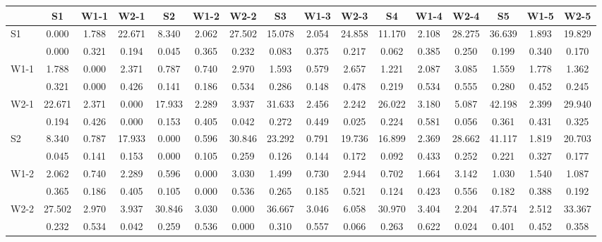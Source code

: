 \begin{table*}[h!]
\begin{center}
\begin{tabular}{| l | c | c | c | c | c | c | c | c | c | c | c | c | c | c | c |}\hline
 & S1 & W1-1 & W2-1 & S2 & W1-2 & W2-2 & S3 & W1-3 & W2-3 & S4 & W1-4 & W2-4 & S5 & W1-5 & W2-5 \\\hline
S1 & 0.000  & 1.788  & 22.671  & 8.340  & 2.062  & 27.502  & 15.078  & 2.054  & 24.858  & 11.170  & 2.108  & 28.275  & 36.639  & 1.893  & 19.829 \\\hline
 & 0.000  & 0.321  & 0.194  & 0.045  & 0.365  & 0.232  & 0.083  & 0.375  & 0.217  & 0.062  & 0.385  & 0.250  & 0.199  & 0.340  & 0.170 \\\hline
W1-1 & 1.788  & 0.000  & 2.371  & 0.787  & 0.740  & 2.970  & 1.593  & 0.579  & 2.657  & 1.221  & 2.087  & 3.085  & 1.559  & 1.778  & 1.362 \\\hline
 & 0.321  & 0.000  & 0.426  & 0.141  & 0.186  & 0.534  & 0.286  & 0.148  & 0.478  & 0.219  & 0.534  & 0.555  & 0.280  & 0.452  & 0.245 \\\hline
W2-1 & 22.671  & 2.371  & 0.000  & 17.933  & 2.289  & 3.937  & 31.633  & 2.456  & 2.242  & 26.022  & 3.180  & 5.087  & 42.198  & 2.399  & 29.940 \\\hline
 & 0.194  & 0.426  & 0.000  & 0.153  & 0.405  & 0.042  & 0.272  & 0.449  & 0.025  & 0.224  & 0.581  & 0.056  & 0.361  & 0.431  & 0.325 \\\hline
S2 & 8.340  & 0.787  & 17.933  & 0.000  & 0.596  & 30.846  & 23.292  & 0.791  & 19.736  & 16.899  & 2.369  & 28.662  & 41.117  & 1.819  & 20.703 \\\hline
 & 0.045  & 0.141  & 0.153  & 0.000  & 0.105  & 0.259  & 0.126  & 0.144  & 0.172  & 0.092  & 0.433  & 0.252  & 0.221  & 0.327  & 0.177 \\\hline
W1-2 & 2.062  & 0.740  & 2.289  & 0.596  & 0.000  & 3.030  & 1.499  & 0.730  & 2.944  & 0.702  & 1.664  & 3.142  & 1.030  & 1.540  & 1.087 \\\hline
 & 0.365  & 0.186  & 0.405  & 0.105  & 0.000  & 0.536  & 0.265  & 0.185  & 0.521  & 0.124  & 0.423  & 0.556  & 0.182  & 0.388  & 0.192 \\\hline
W2-2 & 27.502  & 2.970  & 3.937  & 30.846  & 3.030  & 0.000  & 36.667  & 3.046  & 6.058  & 30.970  & 3.404  & 2.204  & 47.574  & 2.512  & 33.367 \\\hline
 & 0.232  & 0.534  & 0.042  & 0.259  & 0.536  & 0.000  & 0.310  & 0.557  & 0.066  & 0.263  & 0.622  & 0.024  & 0.401  & 0.452  & 0.358 \\\hline

\end{tabular}
\end{center}
\end{table*}
